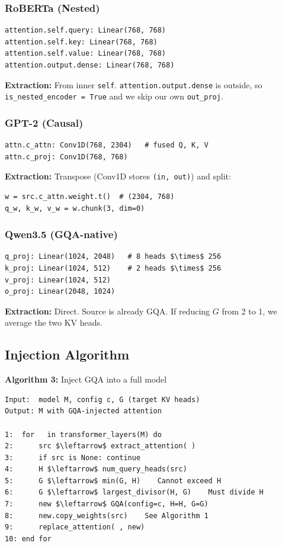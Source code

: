 \subsubsection{RoBERTa (Nested)}

\begin{lstlisting}
attention.self.query: Linear(768, 768)
attention.self.key: Linear(768, 768)
attention.self.value: Linear(768, 768)
attention.output.dense: Linear(768, 768)
\end{lstlisting}

\textbf{Extraction:} From inner \texttt{self}. \texttt{attention.output.dense} is outside, so 
\texttt{is\_nested\_encoder = True} and we skip our own \texttt{out\_proj}.

\subsubsection{GPT-2 (Causal)}

\begin{lstlisting}
attn.c_attn: Conv1D(768, 2304)   # fused Q, K, V
attn.c_proj: Conv1D(768, 768)
\end{lstlisting}

\textbf{Extraction:} Transpose (Conv1D stores \texttt{(in, out)}) and split:

\begin{lstlisting}
w = src.c_attn.weight.t()  # (2304, 768)
q_w, k_w, v_w = w.chunk(3, dim=0)
\end{lstlisting}

\subsubsection{Qwen3.5 (GQA-native)}

\begin{lstlisting}
q_proj: Linear(1024, 2048)   # 8 heads $\times$ 256
k_proj: Linear(1024, 512)    # 2 heads $\times$ 256
v_proj: Linear(1024, 512)
o_proj: Linear(2048, 1024)
\end{lstlisting}

\textbf{Extraction:} Direct. Source is already GQA. If reducing $G$ from 2 to 1, 
we average the two KV heads.

\subsection{Injection Algorithm}

\textbf{Algorithm 3:} Inject GQA into a full model
\begin{lstlisting}
Input:  model M, config c, G (target KV heads)
Output: M with GQA-injected attention

1:  for   in transformer_layers(M) do
2:      src $\leftarrow$ extract_attention( )
3:      if src is None: continue
4:      H $\leftarrow$ num_query_heads(src)
5:      G $\leftarrow$ min(G, H)    Cannot exceed H
6:      G $\leftarrow$ largest_divisor(H, G)    Must divide H
7:      new $\leftarrow$ GQA(config=c, H=H, G=G)
8:      new.copy_weights(src)    See Algorithm 1
9:      replace_attention( , new)
10: end for
\end{lstlisting}


